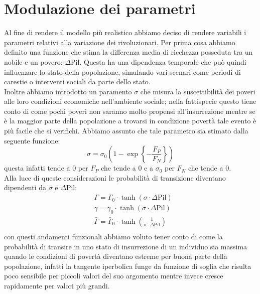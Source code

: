 \section{Modulazione dei parametri}
Al fine di rendere il modello più realistico abbiamo deciso di rendere variabili i parametri relativi alla variazione dei rivoluzionari. Per prima cosa abbiamo definito una funzione che stima la differenza media di ricchezza posseduta tra un nobile e un povero: $\Delta\text{Pil}$. Questa ha una dipendenza temporale che può quindi influenzare lo stato della popolazione, simulando vari scenari come periodi di carestie o interventi sociali da parte dello stato.\\
Inoltre abbiamo introdotto un paramento $\sigma$ che misura la suscettibilità dei poveri alle loro condizioni economiche nell'ambiente sociale; nella fattispecie questo tiene conto di come pochi poveri non saranno molto propensi all'insurrezione mentre se è la maggior parte della popolazione a trovarsi in condizione povertà tale evento è più facile che si verifichi. Abbiamo assunto che tale parametro sia stimato dalla seguente funzione: 
\begin{equation}
	\sigma= \sigma_0\left(1-\exp\left\{-\frac{F_P}{F_N}\right\}\right)
\end{equation}
questa infatti tende a $0$ per $F_P$ che tende a $0$ e a $\sigma_0$ per $F_N$ che tende a $0$.\\
Alla luce di queste considerazioni le probabilità di transizione diventano dipendenti da $\sigma$ e $\Delta\text{Pil}$:
\begin{equation}
	\begin{aligned}
	&\Gamma=\Gamma_{0}\cdot\tanh\left(\sigma\cdot \Delta\text{Pil}\right)\\
	&\gamma=\gamma_{0}\cdot\tanh\left(\sigma\cdot \Delta\text{Pil}\right)\\
	&\bar{\Gamma}=\bar{\Gamma}_{0}\cdot\tanh\left(\frac{1}{\sigma\cdot \Delta\text{Pil}}\right)\\
	\end{aligned}
\end{equation}
con questi andamenti funzionali abbiamo voluto tener conto di come la probabilità di transire in uno stato di insurrezione di un individuo sia massima quando le condizioni di povertà diventano estreme per buona parte della popolazione, infatti la tangente iperbolica funge da funzione di soglia che risulta poco sensibile per piccoli valori del suo argomento mentre invece cresce rapidamente per valori più grandi.\\
